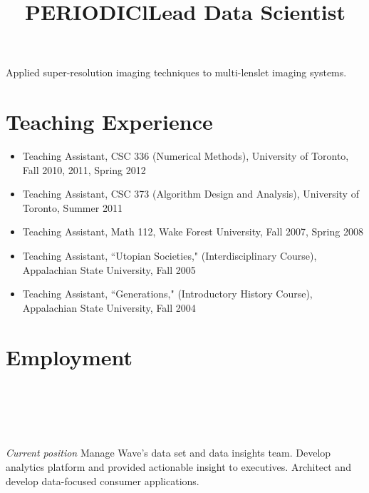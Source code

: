 \documentclass[overlapped,line,letterpaper]{res}
\begin{document}
\begin{resume}
\title{PERIODIC}
\begin{position}
Applied super-resolution imaging techniques to multi-lenslet imaging systems.
\end{position}


\section{\bf Teaching Experience}

\begin{itemize}
\item Teaching Assistant, CSC 336 (Numerical Methods), University of Toronto, Fall 2010, 2011, Spring 2012
\item Teaching Assistant, CSC 373 (Algorithm Design and Analysis), University of Toronto, Summer 2011
\item Teaching Assistant, Math 112, Wake Forest University, Fall 2007, Spring 2008
\item Teaching Assistant, ``Utopian Societies," (Interdisciplinary Course), Appalachian State University, Fall 2005
\item Teaching Assistant, ``Generations," (Introductory History Course), Appalachian State University, Fall 2004
\end{itemize}


\section{\bf Employment}
%
 \begin{format}
 \\
 \title{l}\\
 \body\\
 \end{format}
%

 \title{Lead Data Scientist}
 \begin{position}
 {\em Current position }
Manage Wave’s data set and data insights team. Develop analytics platform and provided actionable insight to executives. Architect and develop data-focused consumer applications.
 \end{position}


\end{resume}
\end{document}
